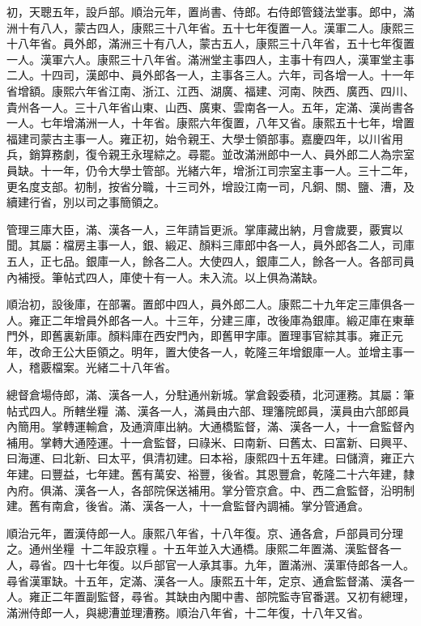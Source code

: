 \begin{pinyinscope}
初，天聰五年，設戶部。順治元年，置尚書、侍郎。右侍郎管錢法堂事。郎中，滿洲十有八人，蒙古四人，康熙三十八年省。五十七年復置一人。漢軍二人。康熙三十八年省。員外郎，滿洲三十有八人，蒙古五人，康熙三十八年省，五十七年復置一人。漢軍六人。康熙三十八年省。滿洲堂主事四人，主事十有四人，漢軍堂主事二人。十四司，漢郎中、員外郎各一人，主事各三人。六年，司各增一人。十一年省增額。康熙六年省江南、浙江、江西、湖廣、福建、河南、陜西、廣西、四川、貴州各一人。三十八年省山東、山西、廣東、雲南各一人。五年，定滿、漢尚書各一人。七年增滿洲一人，十年省。康熙六年復置，八年又省。康熙五十七年，增置福建司蒙古主事一人。雍正初，始令親王、大學士領部事。嘉慶四年，以川省用兵，銷算務劇，復令親王永瑆綜之。尋罷。並改滿洲郎中一人、員外郎二人為宗室員缺。十一年，仍令大學士管部。光緒六年，增浙江司宗室主事一人。三十二年，更名度支部。初制，按省分職，十三司外，增設江南一司，凡銅、關、鹽、漕，及續建行省，別以司之事簡領之。

管理三庫大臣，滿、漢各一人，三年請旨更派。掌庫藏出納，月會歲要，覈實以聞。其屬：檔房主事一人，銀、緞疋、顏料三庫郎中各一人，員外郎各二人，司庫五人，正七品。銀庫一人，餘各二人。大使四人，銀庫二人，餘各一人。各部司員內補授。筆帖式四人，庫使十有一人。未入流。以上俱為滿缺。

順治初，設後庫，在部署。置郎中四人，員外郎二人。康熙二十九年定三庫俱各一人。雍正二年增員外郎各一人。十三年，分建三庫，改後庫為銀庫。緞疋庫在東華門外，即舊裏新庫。顏料庫在西安門內，即舊甲字庫。置理事官綜其事。雍正元年，改命王公大臣領之。明年，置大使各一人，乾隆三年增銀庫一人。並增主事一人，稽覈檔案。光緒二十八年省。

總督倉場侍郎，滿、漢各一人，分駐通州新城。掌倉穀委積，北河運務。其屬：筆帖式四人。所轄坐糧，滿、漢各一人，滿員由六部、理籓院郎員，漢員由六部郎員內簡用。掌轉運輸倉，及通濟庫出納。大通橋監督，滿、漢各一人，十一倉監督內補用。掌轉大通陸運。十一倉監督，曰祿米、曰南新、曰舊太、曰富新、曰興平、曰海運、曰北新、曰太平，俱清初建。曰本裕，康熙四十五年建。曰儲濟，雍正六年建。曰豐益，七年建。舊有萬安、裕豐，後省。其恩豐倉，乾隆二十六年建，隸內府。俱滿、漢各一人，各部院保送補用。掌分管京倉。中、西二倉監督，沿明制建。舊有南倉，後省。滿、漢各一人，十一倉監督內調補。掌分管通倉。

順治元年，置漢侍郎一人。康熙八年省，十八年復。京、通各倉，戶部員司分理之。通州坐糧，十二年設京糧。十五年並入大通橋。康熙二年置滿、漢監督各一人，尋省。四十七年復。以戶部官一人承其事。九年，置滿洲、漢軍侍郎各一人。尋省漢軍缺。十五年，定滿、漢各一人。康熙五十年，定京、通倉監督滿、漢各一人。雍正二年置副監督，尋省。其缺由內閣中書、部院監寺官番選。又初有總理，滿洲侍郎一人，與總漕並理漕務。順治八年省，十二年復，十八年又省。


\end{pinyinscope}
